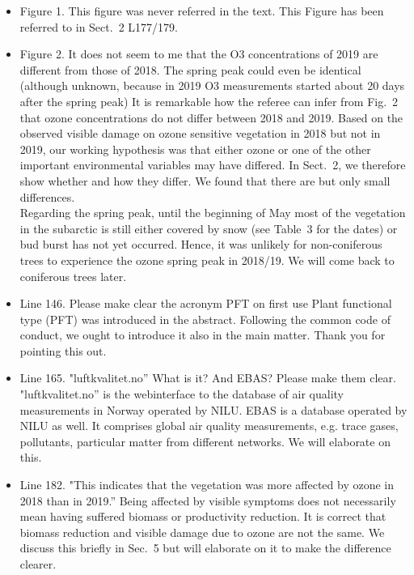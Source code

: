 \documentclass{scrartcl}
\begin{document}
\begin{itemize}
\item {\color{blue}Figure 1. This figure was never referred in the text.}
This Figure has been referred to in Sect.~2 L177/179.

\item {\color{blue}Figure 2. It does not seem to me that the O3 concentrations of 2019 are different from those of 2018. The spring peak could even be identical (although unknown, because in 2019 O3 measurements started about 20 days after the spring peak)}
It is remarkable how the referee can infer from Fig.~2 that ozone concentrations do not differ between 2018 and 2019. Based on the observed visible damage on ozone sensitive vegetation in 2018 but not in 2019, our working hypothesis was that either ozone or one of the other important environmental variables may have differed. In Sect.~2, we therefore show whether and how they differ. We found that there are but only small differences.\\
Regarding the spring peak, until the beginning of May most of the vegetation in the subarctic is still either covered by snow (see Table~3 for the dates) or bud burst has not yet occurred. Hence, it was unlikely for non-coniferous trees to experience the ozone spring peak in 2018/19. We will come back to coniferous trees later. 

\item {\color{blue}Line 146. Please make clear the acronym PFT on first use}
Plant functional type (PFT) was introduced in the abstract. Following the common code of conduct, we ought to introduce it also in the main matter. Thank you for pointing this out.

\item {\color{blue}Line 165. "luftkvalitet.no” What is it? And EBAS? Please make them clear.}
"luftkvalitet.no” is the webinterface to the database of air quality measurements in Norway operated by NILU. EBAS is a database operated by NILU as well. It comprises global air quality measurements, e.g. trace gases, pollutants, particular matter from different networks. We will elaborate on this.

\item {\color{blue}Line 182. "This indicates that the vegetation was more affected by ozone in 2018 than in 2019.” Being affected by visible symptoms does not necessarily mean having suffered biomass or productivity reduction.} It is correct that biomass reduction and visible damage due to ozone are not the same. We discuss this briefly in Sec.~5 but will elaborate on it to make the difference clearer. 


\end{itemize}
\end{document}
